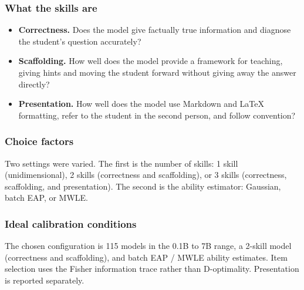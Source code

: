 \subsubsection{What the skills are}
\begin{itemize}
  \item \textbf{Correctness.} Does the model give factually true information and
    diagnose the student's question accurately?
  \item \textbf{Scaffolding.} How well does the model provide a framework for
    teaching, giving hints and moving the student forward without giving away
    the answer directly?
  \item \textbf{Presentation.} How well does the model use Markdown and \LaTeX{}
    formatting, refer to the student in the second person, and follow
    convention?
\end{itemize}

\subsubsection{Choice factors}
Two settings were varied. The first is the number of skills: 1 skill
(unidimensional), 2 skills (correctness and scaffolding), or 3 skills
(correctness, scaffolding, and presentation). The second is the ability
estimator: Gaussian, batch EAP, or MWLE.

\subsubsection{Ideal calibration conditions}
The chosen configuration is 115 models in the 0.1B to 7B range, a 2-skill model
(correctness and scaffolding), and batch EAP / MWLE ability estimates. Item
selection uses the Fisher information trace rather than D-optimality.
Presentation is reported separately.

